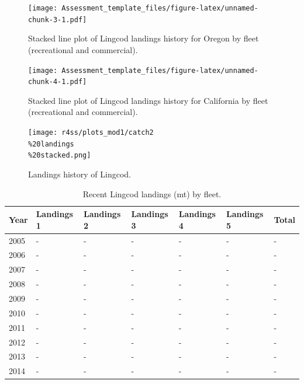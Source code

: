 \documentclass[12pt,]{article}
\begin{document}
\begin{figure}[htbp]
\centering
\texttt{[image: Assessment\_template\_files/figure-latex/unnamed-chunk-3-1.pdf]}
\caption{Stacked line plot of Lingcod landings history for Oregon by
fleet (recreational and commercial). \label{fig:Exec_catch2}}
\end{figure}

\begin{figure}[htbp]
\centering
\texttt{[image: Assessment\_template\_files/figure-latex/unnamed-chunk-4-1.pdf]}
\caption{Stacked line plot of Lingcod landings history for California by
fleet (recreational and commercial). \label{fig:Exec_catch3}}
\end{figure}

\begin{figure}[htbp]
\centering
\texttt{[image: r4ss/plots\_mod1/catch2\\\%20landings\\\%20stacked.png]}
\caption{Landings history of Lingcod. \label{fig:r4ss_catches}}
\end{figure}

\begin{table}[ht]
\centering
\caption{Recent Lingcod landings (mt) by 
                                            fleet.} 
\label{tab:Exec_catch}
\begin{tabular}{l>{\centering}p{1in}>{\centering}p{1in}>{\centering}p{1in}>{\centering}p{.9in}>{\centering}p{.9in}>{\centering}p{.6in}}
  \hline
Year & Landings 1 & Landings 2 & Landings 3 & Landings 4 & Landings 5 & Total \\ 
  \hline
2005 & - & - & - & - & - & - \\ 
  2006 & - & - & - & - & - & - \\ 
  2007 & - & - & - & - & - & - \\ 
  2008 & - & - & - & - & - & - \\ 
  2009 & - & - & - & - & - & - \\ 
  2010 & - & - & - & - & - & - \\ 
  2011 & - & - & - & - & - & - \\ 
  2012 & - & - & - & - & - & - \\ 
  2013 & - & - & - & - & - & - \\ 
  2014 & - & - & - & - & - & - \\ 
   \hline
\end{tabular}
\end{table}

\FloatBarrier
\end{document}
